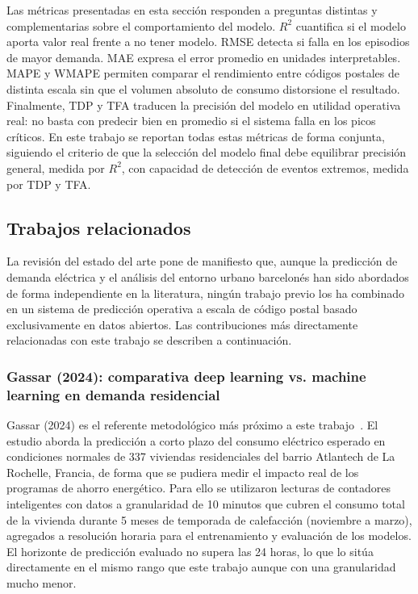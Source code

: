 \documentclass[12pt, a4paper]{article}
\begin{document}
Las métricas presentadas en esta sección responden a preguntas distintas y complementarias sobre el comportamiento del modelo. $R^2$ cuantifica si el modelo aporta valor real frente a no tener modelo. RMSE detecta si falla en los episodios de mayor demanda. MAE expresa el error promedio en unidades interpretables. MAPE y WMAPE permiten comparar el rendimiento entre códigos postales de distinta escala sin que el volumen absoluto de consumo distorsione el resultado. Finalmente, TDP y TFA traducen la precisión del modelo en utilidad operativa real: no basta con predecir bien en promedio si el sistema falla en los picos críticos. En este trabajo se reportan todas estas métricas de forma conjunta, siguiendo el criterio de que la selección del modelo final debe equilibrar precisión general, medida por $R^2$, con capacidad de detección de eventos extremos, medida por TDP y TFA.

\subsection{Trabajos relacionados}


La revisión del estado del arte pone de manifiesto que, aunque la predicción de demanda eléctrica y el análisis del entorno urbano barcelonés han sido abordados de forma independiente en la literatura, ningún trabajo previo los ha combinado en un sistema de predicción operativa a escala de código postal basado exclusivamente en datos abiertos. Las contribuciones más directamente relacionadas con este trabajo se describen a continuación.

\subsubsection{Gassar (2024): comparativa deep learning vs. machine learning en demanda residencial}


Gassar (2024) es el referente metodológico más próximo a este trabajo~\cite{gassar2024}. El estudio aborda la predicción a corto plazo del consumo eléctrico esperado en condiciones normales de 337 viviendas residenciales del barrio Atlantech de La Rochelle, Francia, de forma que se pudiera medir el impacto real de los programas de ahorro energético. Para ello se utilizaron lecturas de contadores inteligentes con datos a granularidad de 10 minutos que cubren el consumo total de la vivienda durante 5 meses de temporada de calefacción (noviembre a marzo), agregados a resolución horaria para el entrenamiento y evaluación de los modelos. El horizonte de predicción evaluado no supera las 24 horas, lo que lo sitúa directamente en el mismo rango que este trabajo aunque con una granularidad mucho menor.
\end{document}

